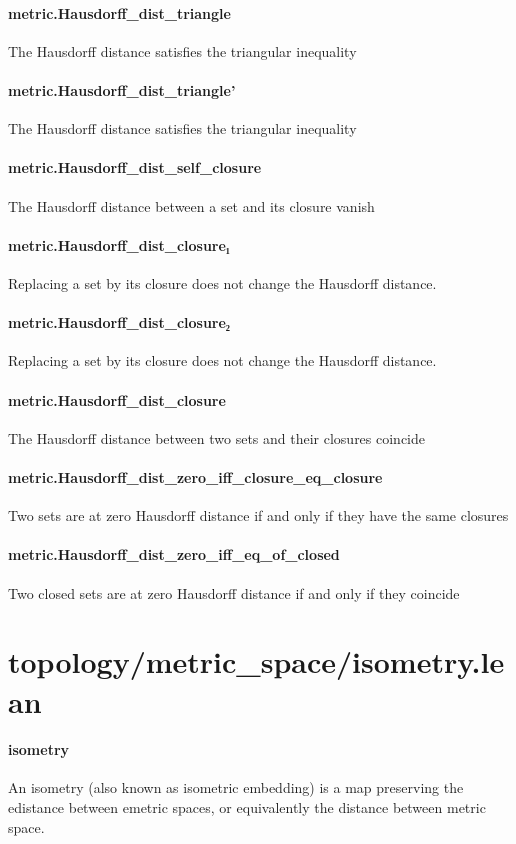 \documentclass{article}
\begin{document}
\paragraph{metric.Hausdorff\_dist\_triangle}
\par
The Hausdorff distance satisfies the triangular inequality
\paragraph{metric.Hausdorff\_dist\_triangle'}
\par
The Hausdorff distance satisfies the triangular inequality
\paragraph{metric.Hausdorff\_dist\_self\_closure}
\par
The Hausdorff distance between a set and its closure vanish
\paragraph{metric.Hausdorff\_dist\_closure₁}
\par
Replacing a set by its closure does not change the Hausdorff distance.
\paragraph{metric.Hausdorff\_dist\_closure₂}
\par
Replacing a set by its closure does not change the Hausdorff distance.
\paragraph{metric.Hausdorff\_dist\_closure}
\par
The Hausdorff distance between two sets and their closures coincide
\paragraph{metric.Hausdorff\_dist\_zero\_iff\_closure\_eq\_closure}
\par
Two sets are at zero Hausdorff distance if and only if they have the same closures
\paragraph{metric.Hausdorff\_dist\_zero\_iff\_eq\_of\_closed}
\par
Two closed sets are at zero Hausdorff distance if and only if they coincide
\section{topology/metric\_space/isometry.lean}\paragraph{isometry}
\par
An isometry (also known as isometric embedding) is a map preserving the edistance
between emetric spaces, or equivalently the distance between metric space.
\end{document}
